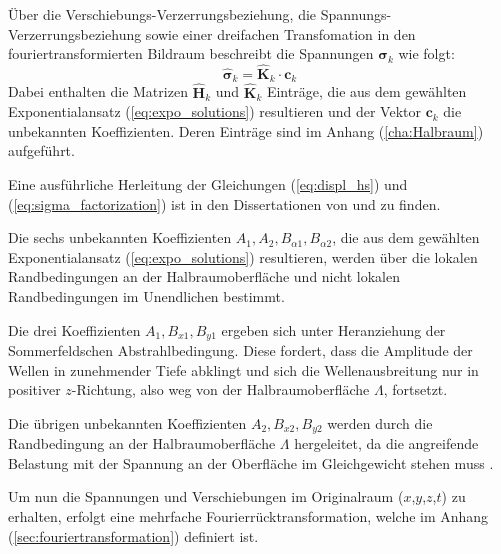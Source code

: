 
Über die Verschiebungs-Verzerrungsbeziehung, die Spannungs-Verzerrungsbeziehung sowie einer dreifachen Transfomation in den fouriertransformierten Bildraum beschreibt \cite{Mueller2007} die Spannungen \(\hat{\boldsymbol{\sigma}}_{k}\) wie folgt:
\begin{equation}\label{eq:sigma_factorization}
	\hat{\boldsymbol{\sigma}}_{k} = \hat{\mathbf{K}}_{k}\cdot \mathbf{c}_{k}
\end{equation}
Dabei enthalten die Matrizen $\hat{\mathbf{H}}_{k}$ und $\hat{\mathbf{K}}_{k}$ Einträge, die aus dem gewählten Exponentialansatz (\ref{eq:expo_solutions}) resultieren und der Vektor $\mathbf{c}_k$ die unbekannten Koeffizienten. Deren Einträge sind im Anhang (\ref{cha:Halbraum}) aufgeführt.

Eine ausführliche Herleitung der Gleichungen (\ref{eq:displ_hs}) und (\ref{eq:sigma_factorization}) ist in den Dissertationen von \cite{Mueller2007} und \cite{Fruehe2010} zu finden.


Die sechs unbekannten Koeffizienten \(A_1, A_2, B_{\alpha1}, B_{\alpha2}\), die aus dem gewählten Exponentialansatz (\ref{eq:expo_solutions}) resultieren, werden über die lokalen Randbedingungen an der Halbraumoberfläche und nicht lokalen Randbedingungen im Unendlichen bestimmt.

Die drei Koeffizienten \(A_1, B_{x1}, B_{y1}\) ergeben sich unter Heranziehung der Sommerfeldschen Abstrahlbedingung. Diese fordert, dass die Amplitude der Wellen in zunehmender Tiefe abklingt und sich die Wellenausbreitung nur in positiver $z$-Richtung, also weg von der Halbraumoberfläche $\Lambda$, fortsetzt.

Die übrigen unbekannten Koeffizienten \(A_2, B_{x2}, B_{y2}\) werden durch die Randbedingung an der Halbraumoberfläche $\Lambda$ hergeleitet, da die angreifende Belastung mit der Spannung an der Oberfläche im Gleichgewicht stehen muss \citep{Mueller2007}.

Um nun die Spannungen und Verschiebungen im Originalraum ($x$,$y$,$z$,$t$) zu erhalten, erfolgt eine mehrfache Fourierrücktransformation, welche im Anhang (\ref{sec:fouriertransformation}) definiert ist.



